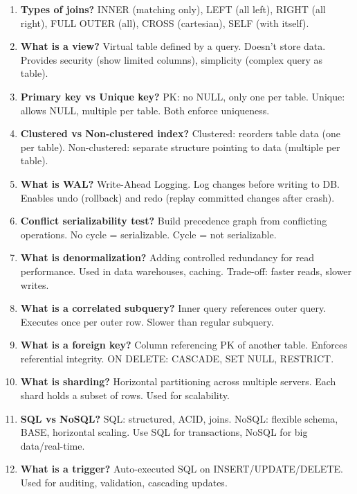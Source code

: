 \documentclass[12pt,a4paper]{article}
\begin{document}
\begin{enumerate}[leftmargin=*, label=\textbf{Q\arabic*.}]
\item \textbf{Types of joins?} INNER (matching only), LEFT (all left), RIGHT (all right), FULL OUTER (all), CROSS (cartesian), SELF (with itself).

\item \textbf{What is a view?} Virtual table defined by a query. Doesn't store data. Provides security (show limited columns), simplicity (complex query as table).

\item \textbf{Primary key vs Unique key?} PK: no NULL, only one per table. Unique: allows NULL, multiple per table. Both enforce uniqueness.

\item \textbf{Clustered vs Non-clustered index?} Clustered: reorders table data (one per table). Non-clustered: separate structure pointing to data (multiple per table).

\item \textbf{What is WAL?} Write-Ahead Logging. Log changes before writing to DB. Enables undo (rollback) and redo (replay committed changes after crash).

\item \textbf{Conflict serializability test?} Build precedence graph from conflicting operations. No cycle = serializable. Cycle = not serializable.

\item \textbf{What is denormalization?} Adding controlled redundancy for read performance. Used in data warehouses, caching. Trade-off: faster reads, slower writes.

\item \textbf{What is a correlated subquery?} Inner query references outer query. Executes once per outer row. Slower than regular subquery.

\item \textbf{What is a foreign key?} Column referencing PK of another table. Enforces referential integrity. ON DELETE: CASCADE, SET NULL, RESTRICT.

\item \textbf{What is sharding?} Horizontal partitioning across multiple servers. Each shard holds a subset of rows. Used for scalability.

\item \textbf{SQL vs NoSQL?} SQL: structured, ACID, joins. NoSQL: flexible schema, BASE, horizontal scaling. Use SQL for transactions, NoSQL for big data/real-time.

\item \textbf{What is a trigger?} Auto-executed SQL on INSERT/UPDATE/DELETE. Used for auditing, validation, cascading updates.
\end{enumerate}
\end{document}
